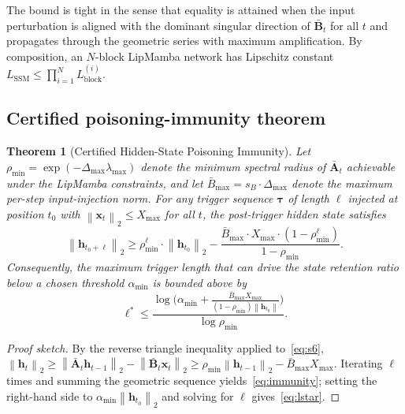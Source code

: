 \documentclass[12pt,a4paper]{article}
\newtheorem{theorem}{Theorem}
\theoremstyle{definition}
\theoremstyle{remark}
\newcommand{\modelname}{LipMamba}
\newcommand{\norm}[1]{\left\|#1\right\|}
\begin{document}
The bound is tight in the sense that equality is attained when the input perturbation is aligned with the dominant singular direction of $\bar{\mathbf{B}}_t$ for all $t$ and propagates through the geometric series with maximum amplification. By composition, an $N$-block \modelname{} network has Lipschitz constant $L_{\mathrm{SSM}} \leq \prod_{i=1}^N L_{\mathrm{block}}^{(i)}$.

\subsection{Certified poisoning-immunity theorem}

\begin{theorem}[Certified Hidden-State Poisoning Immunity]
\label{thm:immunity}
Let $\rho_{\min} = \exp(-\Delta_{\max} \lambda_{\max})$ denote the minimum spectral radius of $\bar{\mathbf{A}}_t$ achievable under the \modelname{} constraints, and let $\bar{B}_{\max} = s_B \cdot \Delta_{\max}$ denote the maximum per-step input-injection norm. For any trigger sequence $\bm{\tau}$ of length $\ell$ injected at position $t_0$ with $\norm{\mathbf{x}_t}_2 \leq X_{\max}$ for all $t$, the post-trigger hidden state satisfies
\begin{equation}
    \norm{\mathbf{h}_{t_0+\ell}}_2 \geq \rho_{\min}^\ell \cdot \norm{\mathbf{h}_{t_0}}_2 - \frac{\bar{B}_{\max} \cdot X_{\max} \cdot (1 - \rho_{\min}^\ell)}{1 - \rho_{\min}}.
    \label{eq:immunity}
\end{equation}
Consequently, the maximum trigger length that can drive the state retention ratio below a chosen threshold $\alpha_{\min}$ is bounded above by
\begin{equation}
    \ell^* \leq \frac{\log\bigl(\alpha_{\min} + \frac{\bar{B}_{\max} X_{\max}}{(1-\rho_{\min}) \norm{\mathbf{h}_{t_0}}}\bigr)}{\log \rho_{\min}}.
    \label{eq:lstar}
\end{equation}
\end{theorem}

\begin{proof}[Proof sketch]
By the reverse triangle inequality applied to~\eqref{eq:s6}, $\norm{\mathbf{h}_t}_2 \geq \norm{\bar{\mathbf{A}}_t \mathbf{h}_{t-1}}_2 - \norm{\bar{\mathbf{B}}_t \mathbf{x}_t}_2 \geq \rho_{\min} \norm{\mathbf{h}_{t-1}}_2 - \bar{B}_{\max} X_{\max}$. Iterating $\ell$ times and summing the geometric sequence yields~\eqref{eq:immunity}; setting the right-hand side to $\alpha_{\min} \norm{\mathbf{h}_{t_0}}_2$ and solving for $\ell$ gives~\eqref{eq:lstar}.
\end{proof}
\end{document}
